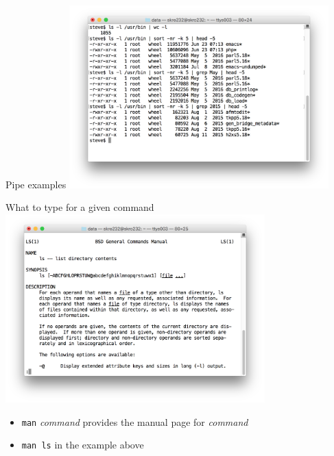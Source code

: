 \documentclass[t]{beamer}
\begin{document}
\begin{frame}{Pipe examples}
  \includegraphics[width=10cm,scale=0.4]{images/pipes.png}
  \note{}
\end{frame}

\begin{frame}{What to type for a given command}
  \includegraphics[width=10cm,scale=0.4]{images/manls.png}
  \begin{itemize}
  \item \texttt{man} \textit{command}  provides the manual page for \textit{command}
  \item  \texttt{man ls} in the example above
  \end{itemize}
  \note{}
\end{frame}
\end{document}
